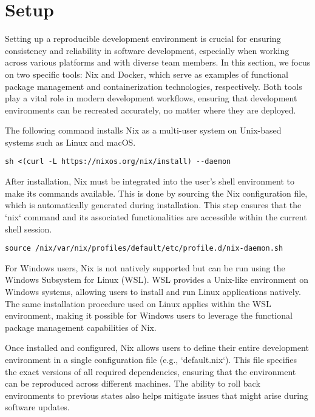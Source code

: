 \section{Setup}

Setting up a reproducible development environment is crucial for ensuring consistency
and reliability in software development, especially when working across various
platforms and with diverse team members. In this section, we focus on two
specific tools: Nix and Docker, which serve as examples of functional package
management and containerization technologies, respectively. Both tools play a
vital role in modern development workflows, ensuring that development
environments can be recreated accurately, no matter where they are deployed.

The following command installs Nix as a multi-user system
on Unix-based systems such as Linux and macOS.

\begin{lstlisting}[caption={Installing Nix on Linux and macOS}]
sh <(curl -L https://nixos.org/nix/install) --daemon
\end{lstlisting}

After installation, Nix must be integrated into the user's shell environment to
make its commands available. This is done by sourcing the Nix configuration file,
which is automatically generated during installation. This step ensures that the `nix`
command and its associated functionalities are accessible within the current shell session.

\begin{lstlisting}[caption={Configuring Shell for Nix}]
source /nix/var/nix/profiles/default/etc/profile.d/nix-daemon.sh
\end{lstlisting}

For Windows users, Nix is not natively supported but can be run using the Windows
Subsystem for Linux (WSL). WSL provides a Unix-like environment on Windows systems,
allowing users to install and run Linux applications natively. The same installation
procedure used on Linux applies within the WSL environment, making it possible for
Windows users to leverage the functional package management capabilities of Nix.

Once installed and configured, Nix allows users to define their entire development
environment in a single configuration file (e.g., `default.nix`). This file specifies
the exact versions of all required dependencies, ensuring that the environment can
be reproduced across different machines. The ability to roll back environments to
previous states also helps mitigate issues that might arise during software updates.

